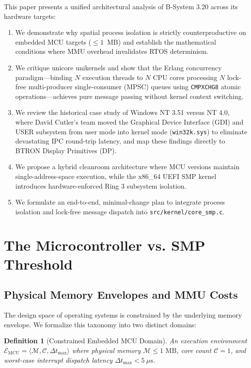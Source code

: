 \documentclass[10pt,journal,compsoc,twocolumn]{article}
\newtheorem{definition}{Definition}
\begin{document}
This paper presents a unified architectural analysis of B-System 3.20 across its hardware targets:
\begin{enumerate}[leftmargin=*]
    \item We demonstrate why spatial process isolation is strictly counterproductive on embedded MCU targets ($\le 1$~MB) and establish the mathematical conditions where MMU overhead invalidates RTOS determinism.
    \item We critique unicore unikernels and show that the Erlang concurrency paradigm---binding $N$ execution threads to $N$ CPU cores processing $N$ lock-free multi-producer single-consumer (MPSC) queues using \texttt{CMPXCHG8} atomic operations---achieves pure message passing without kernel context switching.
    \item We review the historical case study of Windows NT 3.51 versus NT 4.0, where David Cutler's team moved the Graphical Device Interface (GDI) and USER subsystem from user mode into kernel mode (\texttt{win32k.sys}) to eliminate devastating IPC round-trip latency, and map these findings directly to BTRON Display Primitives (DP).
    \item We propose a hybrid cleanroom architecture where MCU versions maintain single-address-space execution, while the x86\_64 UEFI SMP kernel introduces hardware-enforced Ring 3 subsystem isolation.
    \item We formulate an end-to-end, minimal-change plan to integrate process isolation and lock-free message dispatch into \texttt{src/kernel/core\_smp.c}.
\end{enumerate}

\section{The Microcontroller vs. SMP Threshold}
\label{sec:threshold}

\subsection{Physical Memory Envelopes and MMU Costs}
The design space of operating systems is constrained by the underlying memory envelope. We formalize this taxonomy into two distinct domains:

\begin{definition}[Constrained Embedded MCU Domain]
An execution environment $\mathcal{E}_{\text{MCU}} = \langle \mathcal{M}, \mathcal{C}, \Delta t_{\max} \rangle$ where physical memory $\mathcal{M} \le 1\text{ MB}$, core count $\mathcal{C} = 1$, and worst-case interrupt dispatch latency $\Delta t_{\max} < 5\ \mu\text{s}$.
\end{definition}
\end{document}
